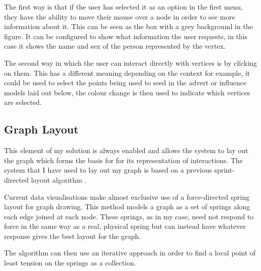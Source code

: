 \documentclass[12pt,a4paper]{article}
\begin{document}
The first way is that if the user has selected it as an option in the first menu, they have the ability to move their mouse over a node in order to see more information about it. This can be seen as the box with a grey background in the figure. It can be configured to show what information the user requests, in this case it shows the name and sex of the person represented by the vertex.

The second way in which the user can interact directly with vertices is by clicking on them. This has a different meaning depending on the context for example, it could be used to select the points being used to seed in the advert or influence models laid out below, the colour change is then used to indicate which vertices are selected.

\subsection{Graph Layout}

This element of my solution is always enabled and allows the system to lay out the graph which forms the basis for for its representation of interactions. The system that I have used to lay out my graph is based on a previous sprint-directed layout algorithm \cite{fruchterman1991graph}.

Current data visualisations make almost exclusive use of a force-directed spring layout for graph drawing. This method models a graph as a set of springs along each edge joined at each node. These springs, as in my case, need not respond to force in the same way as a real, physical spring but can instead have whatever response gives the best layout for the graph.

The algorithm can then use an iterative approach in order to find a local point of least tension on the springs as a collection. 
\end{document}
